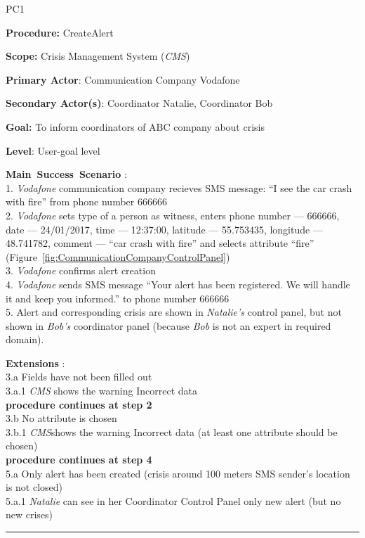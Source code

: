 \begin{lyxlist}{PC1}
\small{
\item [\textbf{Procedure:}] CreateAlert
\item [\textbf{Scope:}] Crisis Management System (\emph{CMS})
\item [\textbf{Primary Actor}:] Communication Company Vodafone
\item [\textbf{Secondary Actor(s)}:] Coordinator Natalie, Coordinator Bob
\item [\textbf{Goal:}] To inform coordinators of ABC company about crisis
\item [\textbf{Level}:] User-goal level

\item [\textbf{Main~Success~Scenario}]:\\
1. \emph{Vodafone} communication company recieves SMS message: ``I see the car crash
with fire'' from phone number 666666\\
2. \emph{Vodafone} sets type of a person as witness, enters phone
number --- 666666, date --- 24/01/2017, time --- 12:37:00, latitude
\hspace*{0.4cm} --- 55.753435, longitude --- 48.741782, comment --- ``car crash
with fire'' and selects attribute ``fire'' (Figure~\ref{fig:CommunicationCompanyControlPanel})\\
3. \emph{Vodafone} confirms alert creation\\
4. \emph{Vodafone} sends SMS message ``Your alert has been registered.
We will handle it and keep you informed.'' to phone number \hspace*{0.4cm}
666666\\
5. Alert and corresponding crisis are shown in \emph{Natalie's} control panel,
but not shown in \emph{Bob’s} coordinator panel (because
\hspace*{0.4cm} \emph{Bob} is not an expert in required domain).

\item [\textbf{Extensions}]:\\
3.a Fields have not been filled out\\
	\hspace*{0.5cm} 3.a.1 \emph{CMS} shows the warning Incorrect data\\
	\hspace*{0.5cm} \textbf{procedure continues at step 2}\\
3.b No attribute is chosen\\
	\hspace*{0.5cm} 3.b.1 \emph{CMS}shows the warning Incorrect data 
	(at least one attribute should be chosen)\\
	\hspace*{0.5cm} \textbf{procedure continues at step 4}\\
5.a Only alert has been created (crisis around 100 meters SMS sender's location
is not closed)\\
	\hspace*{0.5cm} 5.a.1 \emph{Natalie} can see in her Coordinator Control Panel
	only new alert (but no new crises)\\
}
\end{lyxlist}
\hrule
\vspace{0.5cm}


